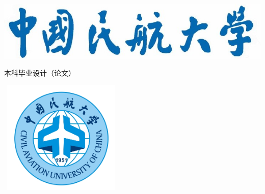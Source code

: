 \begin{titlepage}
    \setlength{\headsep}{1.3cm}
    {
    
              \begin{center}
              \includegraphics[]{./pic/pic1.jpg}
              \end{center}
    }
              \vspace{-12mm}
            \begin{center}
                \setlength{\baselineskip}{0pt}\fakeli {}本科毕业设计（论文）
            \end{center}
    
            \vspace{-3.8mm}
              \begin{center}
              \includegraphics[height=5.45cm,width=5.9cm]{./pic/pic2.png}
              \end{center}
            \vspace{-1pt}
            \begin{center}\fakehei{}\Title \end{center}
            \vspace{8ex}
    

\end{titlepage}
